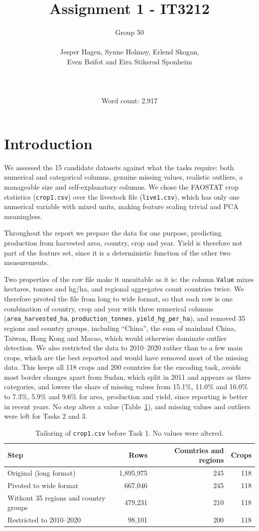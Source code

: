 \documentclass{article}
\title{Assignment 1 - IT3212}
\author{Group 50 \\ \\ Jesper Hagen, Synne Holmøy, Erlend Skogan, \\ Even Bøifot and Eira Stiksrud Sponheim \\ \\ \\ \\ Word count: 2,917}
\date{}
\begin{document}
\maketitle

\newpage

\section*{Introduction}

We assessed the 15 candidate datasets against what the tasks require: both numerical and categorical columns, genuine missing values, realistic outliers, a manageable size and self-explanatory columns. We chose the FAOSTAT crop statistics (\texttt{crop1.csv}) over the livestock file (\texttt{live1.csv}), which has only one numerical variable with mixed units, making feature scaling trivial and PCA meaningless.

Throughout the report we prepare the data for one purpose, predicting production from harvested area, country, crop and year. Yield is therefore not part of the feature set, since it is a deterministic function of the other two measurements.

Two properties of the raw file make it unsuitable as it is: the column \texttt{Value} mixes hectares, tonnes and hg/ha, and regional aggregates count countries twice. We therefore pivoted the file from long to wide format, so that each row is one combination of country, crop and year with three numerical columns (\texttt{area\_harvested\_ha}, \texttt{production\_tonnes}, \texttt{yield\_hg\_per\_ha}), and removed 35 regions and country groups, including ``China'', the sum of mainland China, Taiwan, Hong Kong and Macao, which would otherwise dominate outlier detection. We also restricted the data to 2010--2020 rather than to a few main crops, which are the best reported and would have removed most of the missing data. This keeps all 118 crops and 200 countries for the encoding task, avoids most border changes apart from Sudan, which split in 2011 and appears as three categories, and lowers the share of missing values from 15.1\%, 11.0\% and 16.0\% to 7.3\%, 5.9\% and 9.6\% for area, production and yield, since reporting is better in recent years. No step alters a value (Table~\ref{tab:tailoring}), and missing values and outliers were left for Tasks 2 and 3.

\begin{table}[H]
    \centering
    \begin{tabular}{lrrr}
        \toprule
        Step & Rows & Countries and regions & Crops \\
        \midrule
        Original (long format) & 1,895,975 & 245 & 118 \\
        Pivoted to wide format & 667,046 & 245 & 118 \\
        Without 35 regions and country groups & 479,231 & 210 & 118 \\
        Restricted to 2010--2020 & 98,101 & 200 & 118 \\
        \bottomrule
    \end{tabular}
    \caption{Tailoring of \texttt{crop1.csv} before Task 1. No values were altered.}
    \label{tab:tailoring}
\end{table}
\end{document}
